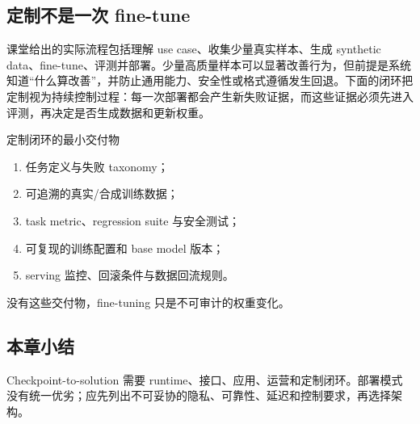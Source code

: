 \subsection{定制不是一次 fine-tune}

课堂给出的实际流程包括理解 use case、收集少量真实样本、生成 synthetic data、fine-tune、评测并部署。少量高质量样本可以显著改善行为，但前提是系统知道“什么算改善”，并防止通用能力、安全性或格式遵循发生回退。下面的闭环把定制视为持续控制过程：每一次部署都会产生新失败证据，而这些证据必须先进入评测，再决定是否生成数据和更新权重。


\begin{importantbox}{定制闭环的最小交付物}
\begin{enumerate}
  \item 任务定义与失败 taxonomy；
  \item 可追溯的真实/合成训练数据；
  \item task metric、regression suite 与安全测试；
  \item 可复现的训练配置和 base model 版本；
  \item serving 监控、回滚条件与数据回流规则。
\end{enumerate}
没有这些交付物，fine-tuning 只是不可审计的权重变化。
\end{importantbox}


\subsection{本章小结}

Checkpoint-to-solution 需要 runtime、接口、应用、运营和定制闭环。部署模式没有统一优劣；应先列出不可妥协的隐私、可靠性、延迟和控制要求，再选择架构。

